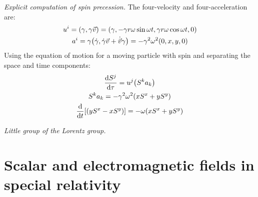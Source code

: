 \documentclass{report}
\begin{document}
\begin{subquests}
	\item \emph{Explicit computation of spin precession.}
	The four-velocity and four-acceleration are:
	\begin{gather*}
		u^i = \pqty{\gamma, \gamma \vec{v}} = \pqty{\gamma, -\gamma r\omega\sin\omega t, \gamma r\omega\cos\omega t, 0} \\
		a^i = \gamma\pqty{\dot{\gamma}, \dot{\gamma}\vec{v} + \dot{\vec{v}}\gamma} = -\gamma^2 \omega^2\pqty{0,x,y,0}
	\end{gather*}
	Using the equation of motion for a moving particle with spin and separating the space and time components:
	\begin{gather*}
		\dv{S^j}{\tau} = u^j \pqty{S^k a_k} \\
		S^k a_k = -\gamma^2 \omega^2 \pqty{xS^x + yS^y} \\
		\dv{t}\bqty{\pqty{yS^x - xS^y}} = -\omega\pqty{xS^x + yS^y}
	\end{gather*}

	\item \emph{Little group of the Lorentz group.}
\end{subquests}


\chapter{Scalar and electromagnetic fields in special relativity}
\end{document}
